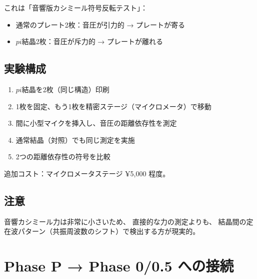 \documentclass[11pt,a4paper]{article}
\def\pi{pi}%
\def\textbf#1{#1}%
\begin{document}
これは「音響版カシミール符号反転テスト」：
\begin{itemize}
\item 通常のプレート2枚：音圧が引力的 → プレートが寄る
\item $\pi$結晶2枚：音圧が斥力的 → プレートが離れる
\end{itemize}

\subsection{実験構成}

\begin{enumerate}
\item $\pi$結晶を2枚（同じ構造）印刷
\item 1枚を固定、もう1枚を精密ステージ（マイクロメータ）で移動
\item 間に小型マイクを挿入し、音圧の距離依存性を測定
\item 通常結晶（対照）でも同じ測定を実施
\item 2つの距離依存性の\textbf{符号}を比較
\end{enumerate}

追加コスト：マイクロメータステージ ¥5,000 程度。

\subsection{注意}

音響カシミール力は非常に小さいため、
直接的な力の測定よりも、
結晶間の定在波パターン（共振周波数のシフト）で検出する方が現実的。


\section{Phase P → Phase 0/0.5 への接続}
\end{document}
